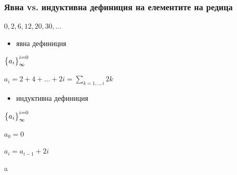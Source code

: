 \documentclass{beamer}
\begin{document}
\begin{frame}[fragile]
\frametitle{Явна vs. индуктивна дефиниция на елементите на редица}

\begin{center}
$0,2,6,12,20,30,...$
\end{center}

\pause

\begin{itemize}
  \item явна дефиниция
\end{itemize}

\begin{center}
  $\big{\{}a_i\big{\}}_\infty^{i=0}$

  \vspace{10px}

  $a_i = 2 + 4 + ... + 2i = \sum\limits_{k=1,..,i}2k$

\end{center}

\pause

\begin{itemize}
  \item индуктивна дефиниция
\end{itemize}


\begin{center}
  $\big{\{}a_i\big{\}}_\infty^{i=0}$

  \vspace{10px}

  $a_0 = 0$

  $a_i = a_{i-1} + 2i$
\end{center}

a

\end{frame}
\end{document}
